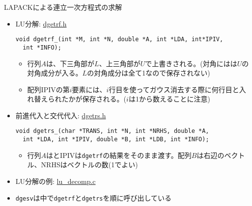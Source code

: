 \begin{frame}[t,fragile]{LAPACKによる連立一次方程式の求解}
  \begin{itemize}
  \item LU分解: \href{https://github.com/todo-group/computer-experiments/blob/master/exercise/linear_system/dgetrf.h}{dgetrf.h}
\begin{lstlisting}
void dgetrf_(int *M, int *N, double *A, int *LDA, int*IPIV,
  int *INFO);
\end{lstlisting}
\begin{itemize}
\item 行列$A$は、下三角部が$L$、上三角部が$U$で上書きされる。(対角にはは$U$の対角成分が入る。$L$の対角成分は全て1なので保存されない)
\item 配列IPIVの第$i$要素には、$i$行目を使ってガウス消去する際に何行目と入れ替えられたかが保存される。($i$は1から数えることに注意)
\end{itemize}
  \item 前進代入と交代代入: \href{https://github.com/todo-group/computer-experiments/blob/master/exercise/linear_system/dgetrs.h}{dgetrs.h}
\begin{lstlisting}
void dgetrs_(char *TRANS, int *N, int *NRHS, double *A,
  int *LDA, int *IPIV, double *B, int *LDB, int *INFO);
\end{lstlisting}
\begin{itemize}
\item 行列$A$はとIPIVは{\tt dgetrf}の結果をそのまま渡す。配列$B$は右辺のベクトル、NRHSはベクトルの数(1でよい)
\end{itemize}
  \item LU分解の例: \href{https://github.com/todo-group/computer-experiments/blob/master/exercise/linear_system/lu_decomp.c}{lu\_decomp.c}
  \item {\tt dgesv}は中で{\tt dgetrf}と{\tt dgetrs}を順に呼び出している
  \end{itemize}
\end{frame}
